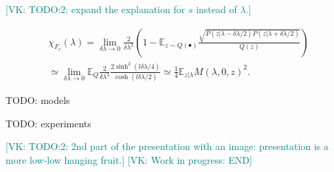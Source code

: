 \documentclass[american,aps,pra,reprint,floatfix,nofootinbib,superscriptaddress]{revtex4-2}
\newcommand{\VK}[1]{\textcolor{teal}{[VK: #1]}}
\begin{document}
\VK{TODO:2: expand the explanation for $s$ instead of $\lambda$.}

    \begin{multline*}
      \chi_{F_c}(\lambda) = \lim_{\delta \lambda\to 0} \frac2{\delta \lambda^2} \left(1 - \mathbb{E}_{z\sim Q(\bullet)} \frac{\sqrt{P(z|\lambda-\delta \lambda/2)P(z|\lambda+\delta \lambda/2)}}{Q(z)}\right)
      \\ \simeq \lim_{\delta \lambda\to 0} \mathbb{E}_{Q}\frac2{\delta \lambda^2}\frac{2\sinh^2(l\delta \lambda/4)}{\cosh(l\delta \lambda/2)} \simeq \frac14 \mathbb{E}_{z|\lambda} M(\lambda, 0, z)^2.
    \end{multline*}

TODO: models

TODO: experiments

\VK{TODO:2: 2nd part of the presentation with an image: presentation is a more low-low hanging fruit.}
\VK{Work in progress: END}



\end{document}
